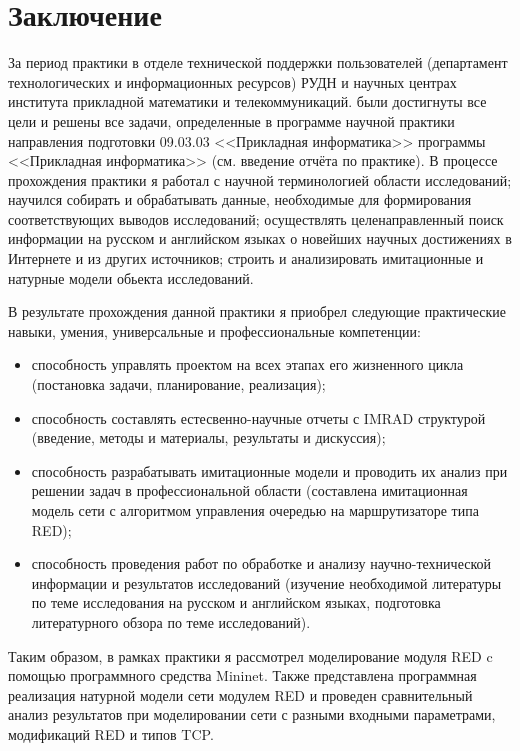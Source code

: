 \chapter*{Заключение}

За период практики в отделе технической поддержки пользователей
(департамент технологических и информационных ресурсов) РУДН и научных
центрах института прикладной математики и телекоммуникаций.  были
достигнуты все цели и решены все задачи, определенные в программе
научной практики направления подготовки 09.03.03 <<Прикладная
информатика>> программы <<Прикладная информатика>> (см. введение
отчёта по практике). В процессе прохождения практики я работал с
научной терминологией области исследований; научился собирать и
обрабатывать данные, необходимые для формирования
соответствующих выводов исследований; осуществлять целенаправленный
поиск информации на русском и английском языках о новейших научных
достижениях в Интернете и из других источников; строить и анализировать
имитационные и натурные модели обьекта исследований.

В результате прохождения данной практики я приобрел следующие
практические навыки, умения, универсальные и профессиональные
компетенции:

\begin{itemize}
\item способность управлять проектом на всех этапах его жизненного
  цикла (постановка задачи, планирование, реализация);
\item способность составлять естесвенно-научные отчеты с IMRAD
  структурой (введение, методы и материалы, результаты и дискуссия);
\item способность разрабатывать имитационные модели и проводить их
  анализ при решении задач в профессиональной области (составлена
  имитационная модель сети с алгоритмом управления очередью на 
  маршрутизаторе типа RED);
\item способность проведения работ по обработке и анализу
  научно-технической информации и результатов исследований (изучение
  необходимой литературы по теме исследования на русском и английском
  языках, подготовка литературного обзора по теме исследований).
\end{itemize}

Таким образом, в рамках практики я рассмотрел моделирование модуля RED
c помощью программного средства Mininet. Также представлена
программная реализация натурной модели сети модулем RED и проведен
сравнительный анализ результатов при моделировании сети с разными
входными параметрами, модификаций RED и типов TCP.



